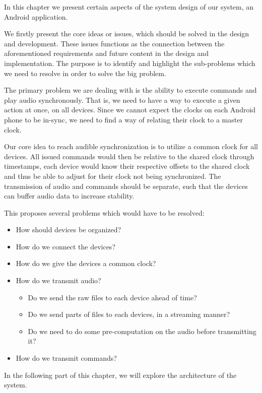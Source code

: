 In this chapter we present certain aspects of the system design of our system, an Android application.

We firstly present the core ideas or issues, which should be solved in the design and development.
These issues functions as the connection between the aforementioned requirements and future content in the design and implementation.
The purpose is to identify and highlight the sub-problems which we need to resolve in order to solve the big problem.

The primary problem we are dealing with is the ability to execute commands and play audio synchronously.
That is, we need to have a way to execute a given action at once, on all devices.
Since we cannot expect the clocks on each Android phone to be in-sync, we need to find a way of relating their clock to a master clock.

Our core idea to reach audible synchronization is to utilize a common clock for all devices.
All issued commands would then be relative to the shared clock through timestamps, each device would know their respective offsets to the shared clock and thus be able to adjust for their clock not being synchronized.
The transmission of audio and commands should be separate, such that the devices can buffer audio data to increase stability.

This proposes several problems which would have to be resolved:
\begin{itemize}
    \item How should devices be organized?
    \item How do we connect the devices?
    \item How do we give the devices a common clock?
    \item How do we transmit audio?
    \begin{itemize}
        \item Do we send the raw files to each device ahead of time?
        \item Do we send parts of files to each devices, in a streaming manner?
        \item Do we need to do some pre-computation on the audio before transmitting it?
    \end{itemize}
    \item How do we transmit commands?
\end{itemize}

\bigskip\noindent
In the following part of this chapter, we will explore the architecture of the system.

